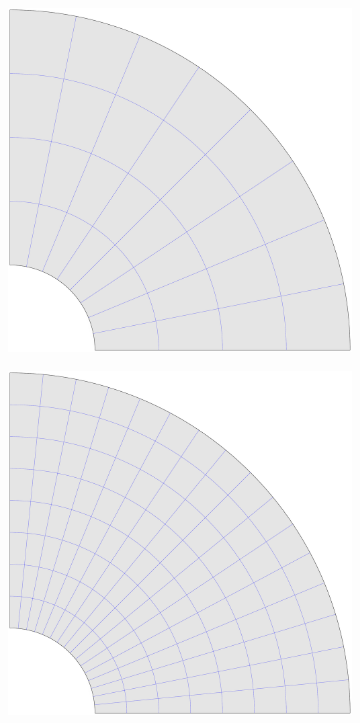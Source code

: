 \documentclass{article}
\begin{document}
\begin{figure}
\begin{subfigure}[b]{0.18\linewidth}
    \end{subfigure}
    \begin{subfigure}[b]{0.18\linewidth}        %
        \centering
        \includegraphics[width=\linewidth]{mesh_hole_2}
    \end{subfigure}
    \begin{subfigure}[b]{0.18\linewidth}        %
        \centering
        \includegraphics[width=\linewidth]{mesh_hole_3}

\end{subfigure}
\end{figure}
\end{document}
